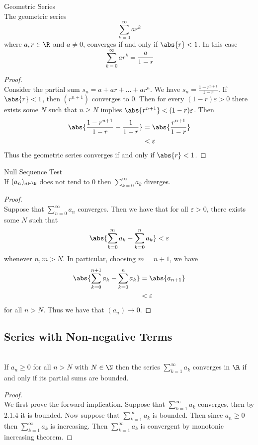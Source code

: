 \documentclass[a4paper]{article}
\begin{document}
\begin{eg}{Geometric Series}{}\\
The geometric series $$\sum_{k=0}^{\infty}ar^k$$ where $a,r\in\R$ and $a\neq0$, converges if and only if $\abs{r}<1$. In this case $$\sum_{k=0}^{\infty}ar^k=\frac{a}{1-r}$$ 
\begin{proof}\\ Consider the partial sum $s_n=a+ar+\dots+ar^{n}$. We have $s_n=\frac{1-r^{n+1}}{1-r}$. If $\abs{r}<1$, then $(r^{n+1})$ converges to $0$. Then for every $(1-r)\varepsilon>0$ there exists some $N$ such that $n\geq N$ implies $\abs{r^{n+1}}<(1-r)\varepsilon$. Then
\begin{align*}
\abs{\frac{1-r^{n+1}}{1-r}-\frac{1}{1-r}}&=\abs{\frac{r^{n+1}}{1-r}}\\
&<\varepsilon
\end{align*} Thus the geometric series converges if and only if $\abs{r}<1$. 
\end{proof}
\end{eg}

\begin{prp}{Null Sequence Test}{}\\ If $(a_n)_{n\in\N}$ does not tend to $0$ then $\sum_{k=0}^\infty a_k$ diverges. 
\begin{proof}\\ Suppose that $\sum_{n=0}^\infty a_n$ converges. Then we have that for all $\varepsilon>0$, there exists some $N$ such that $$\abs{\sum_{k=0}^m a_k-\sum_{k=0}^n a_k}<\varepsilon$$ whenever $n,m>N$. In particular, choosing $m=n+1$, we have
\begin{align*}
\abs{\sum_{k=0}^{n+1} a_k-\sum_{k=0}^n a_k}&=\abs{a_{n+1}}\\
&<\varepsilon
\end{align*} for all $n>N$. Thus we have that $(a_{n})\to 0$. 
\end{proof}
\end{prp}

\subsection{Series with Non-negative Terms}
\begin{prp}{}{}\\ If $a_n\geq 0 $ for all $n>N$ with $N\in\N$ then the series $\sum_{k=1}^\infty a_k$ converges in $\R$ if and only if its partial sums are bounded. 
\begin{proof}\\ We first prove the forward implication. Suppose that $\sum_{k=1}^\infty a_k$ converges, then by 2.1.4 it is bounded. Now suppose that $\sum_{k=1}^\infty a_k$ is bounded. Then since $a_n\geq0$ then $\sum_{k=1}^\infty a_k$ is increasing. Then $\sum_{k=1}^\infty a_k$ is convergent by monotonic increasing theorem. 
\end{proof}
\end{prp}
\end{document}
